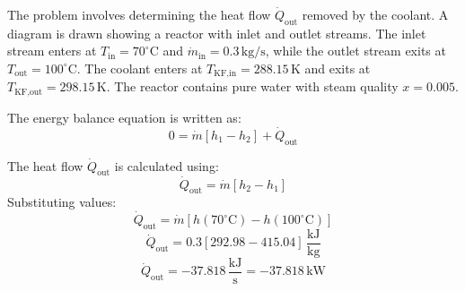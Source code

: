 The problem involves determining the heat flow \( \dot{Q}_{\text{out}} \) removed by the coolant. A diagram is drawn showing a reactor with inlet and outlet streams. The inlet stream enters at \( T_{\text{in}} = 70^\circ\text{C} \) and \( \dot{m}_{\text{in}} = 0.3 \, \text{kg/s} \), while the outlet stream exits at \( T_{\text{out}} = 100^\circ\text{C} \). The coolant enters at \( T_{\text{KF,in}} = 288.15 \, \text{K} \) and exits at \( T_{\text{KF,out}} = 298.15 \, \text{K} \). The reactor contains pure water with steam quality \( x = 0.005 \).  

The energy balance equation is written as:  
\[
0 = \dot{m} \left[ h_1 - h_2 \right] + \dot{Q}_{\text{out}}
\]  

The heat flow \( \dot{Q}_{\text{out}} \) is calculated using:  
\[
\dot{Q}_{\text{out}} = \dot{m} \left[ h_2 - h_1 \right]
\]  
Substituting values:  
\[
\dot{Q}_{\text{out}} = \dot{m} \left[ h(70^\circ\text{C}) - h(100^\circ\text{C}) \right]
\]  
\[
\dot{Q}_{\text{out}} = 0.3 \left[ 292.98 - 415.04 \right] \, \frac{\text{kJ}}{\text{kg}}
\]  
\[
\dot{Q}_{\text{out}} = -37.818 \, \frac{\text{kJ}}{\text{s}} = -37.818 \, \text{kW}
\]